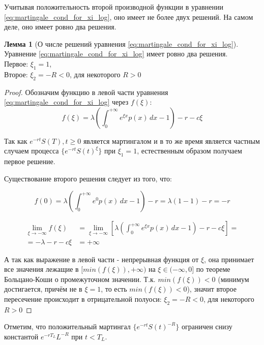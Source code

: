 \documentclass[a4paper,12pt]{article}
\theoremstyle{definition}
\newtheorem{lemma}{Лемма}
\begin{document}
Учитывая положительность второй производной функции в уравнении \eqref{eq:martingale_cond_for_xi_log}, оно имеет не более двух решений. На самом деле, оно имеет ровно два решения.
\begin{lemma}[О числе решений уравнения \eqref{eq:martingale_cond_for_xi_log}]\label{thm:solution_for_mart_cond_m1}
Уравнение \eqref{eq:martingale_cond_for_xi_log} имеет ровно два решения. \\
Первое: $\xi_1 = 1$, \\
Второе: $\xi_2 = -R < 0$, для некоторого $R > 0$
\end{lemma}
\begin{proof}
Обозначим функцию в левой части уравнения \eqref{eq:martingale_cond_for_xi_log} через $f(\xi)$:
\begin{equation*}
f(\xi) = \lambda \left(\int_{0}^{+\infty} e^{\xi x} p(x) \,dx - 1\right) - r - c\xi
\end{equation*}

Так как ${e^{-rt} S(T), t \ge 0}$ является мартингалом и в то же время является частным случаем процесса  $\{e^{-rt}S(t)^{\xi}\}$ при $\xi_1 = 1$, естественным образом получаем первое решение.

Существование второго решения следует из того, что:

\begin{equation*}
f(0) = \lambda \left(\int_{0}^{+\infty} e^{0} p(x) \,dx - 1\right) - r = \lambda (1 - 1) - r = -r
\end{equation*}

\begin{equation*}
\begin{split}
\lim_{\xi\to-\infty} f(\xi) &= \lim_{\xi\to-\infty} \left[ \lambda \left(\int_{0}^{+\infty} e^{\xi x} p(x) \,dx - 1\right) - r - c\xi \right] =\\
= - \lambda - r - c \xi &= +\infty
\end{split}
\end{equation*}

А так как выражение в левой части - непрерывная функция от $\xi$, она принимает все значения лежащие в $[min(f(\xi)), +\infty)$ на $\xi \in (-\infty, 0]$ по теореме Больцано-Коши о промежуточном значении. Т.к. $min(f(\xi)) < 0$ (минимум достигается, причём не в $\xi = 1$, то есть $min(f(\xi)) < 0$), значит второе пересечение происходит в отрицательной полуоси: $\xi_2 = -R < 0$, для некоторого $R > 0$
\end{proof}

Отметим, что положительный мартингал $\{e^{-rt} S(t)^{-R}\}$ ограничен снизу константой $e^{-r T_L} L^{-R}$ при $t < T_L$. 
\end{document}
